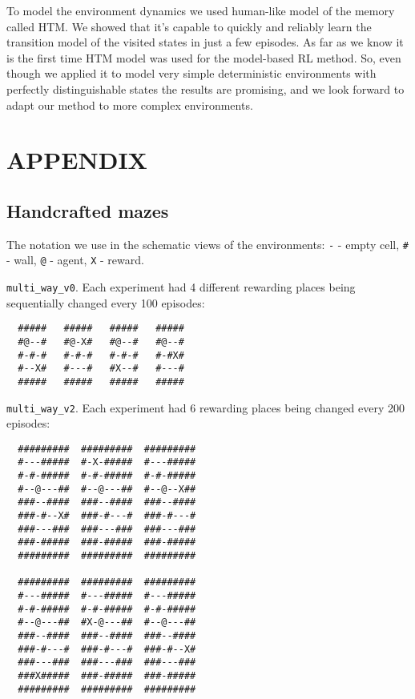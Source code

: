 \documentclass[a4paper,twoside]{article}
\begin{document}
To model the environment dynamics we used human-like model of the memory called HTM. We showed that it's capable to quickly and reliably learn the transition model of the visited states in just a few episodes. As far as we know it is the first time HTM model was used for the model-based RL method. So, even though we applied it to model very simple deterministic environments with perfectly distinguishable states the results are promising, and we look forward to adapt our method to more complex environments.

{\small}

\section*{\uppercase{Appendix}}

\subsection{Handcrafted mazes} \label{apx_handcrafted_mazes}

The notation we use in the schematic views of the environments: \verb|-| - empty cell, \verb|#| - wall, \verb|@| - agent, \verb|X| - reward.

\texttt{multi\_way\_v0}. Each experiment had 4 different rewarding places being sequentially changed every 100 episodes:

\begin{verbatim}
  #####   #####   #####   #####
  #@--#   #@-X#   #@--#   #@--#
  #-#-#   #-#-#   #-#-#   #-#X#
  #--X#   #---#   #X--#   #---#
  #####   #####   #####   #####
\end{verbatim}

\texttt{multi\_way\_v2}. Each experiment had 6 rewarding places being changed every 200 episodes:

\begin{verbatim}
  #########  #########  #########
  #---#####  #-X-#####  #---#####
  #-#-#####  #-#-#####  #-#-#####
  #--@---##  #--@---##  #--@--X##
  ###--####  ###--####  ###--####
  ###-#--X#  ###-#---#  ###-#---#
  ###---###  ###---###  ###---###
  ###-#####  ###-#####  ###-#####
  #########  #########  #########

  #########  #########  #########
  #---#####  #---#####  #---#####
  #-#-#####  #-#-#####  #-#-#####
  #--@---##  #X-@---##  #--@---##
  ###--####  ###--####  ###--####
  ###-#---#  ###-#---#  ###-#--X#
  ###---###  ###---###  ###---###
  ###X#####  ###-#####  ###-#####
  #########  #########  #########
\end{verbatim}
\end{document}
